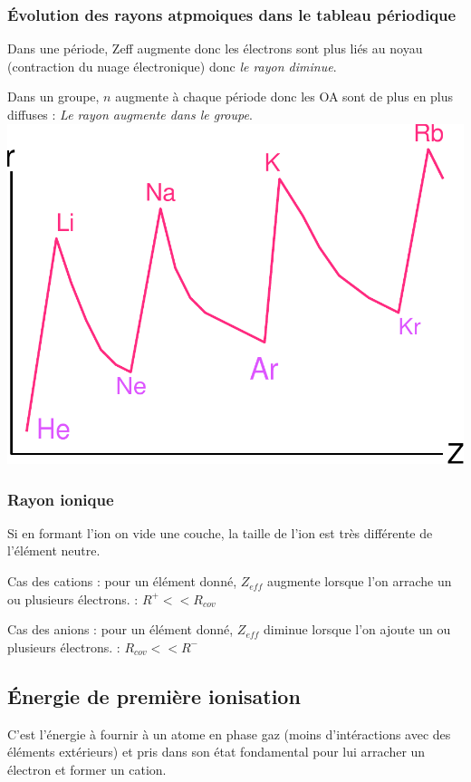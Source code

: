\documentclass[french]{yLectureNote}
\begin{document}
\subsubsection{Évolution des rayons atpmoiques dans le tableau périodique}
\begin{multicols}{2}
Dans une période, Zeff augmente donc les électrons sont plus liés au noyau (contraction du
nuage électronique) donc \emph{le rayon diminue}.

Dans un groupe, $n$ augmente à chaque période donc les OA sont de plus en plus diffuses : \emph{Le rayon augmente dans le groupe}.
\columnbreak
\includegraphics[scale=0.3]{rayon}
\end{multicols}


\subsubsection{Rayon ionique}
Si en formant l'ion on vide une couche, la taille de l'ion est très différente de l'élément neutre.


Cas des cations : pour un élément donné, $Z_{eff}$ augmente lorsque l’on arrache un ou plusieurs électrons. : $R^+ << R_{cov}$

Cas des anions : pour un élément donné, $Z_{eff}$ diminue lorsque l’on ajoute un ou plusieurs électrons. : $R_{cov} << R^-$
\subsection{Énergie de première ionisation}
C’est l’énergie à fournir à un atome en phase gaz (moins d'intéractions avec des éléments extérieurs) et pris dans son état fondamental pour lui arracher un électron et former un cation.
\end{document}
